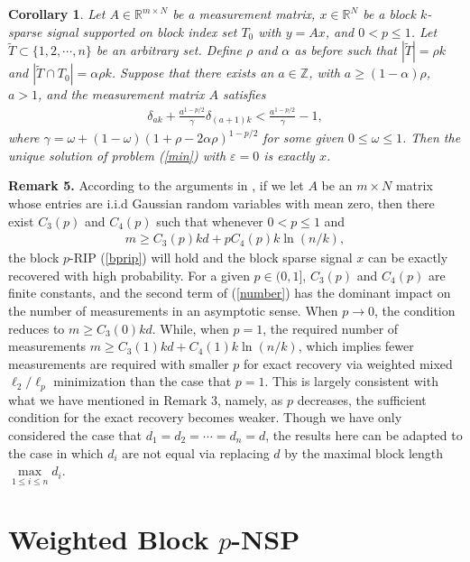 \documentclass[11pt]{article}
\newtheorem{cor}{Corollary}
\begin{document}
\begin{cor} Let $A\in\mathbb{R}^{m\times N}$ be a measurement matrix, $x\in\mathbb{R}^N$ be a block $k$-sparse signal supported on block index set $T_0$ with $y=Ax$, and $0<p\leq 1$. Let $\tilde{T}\subset\{1,2,\cdots,n\}$ be an arbitrary set. Define $\rho$ and $\alpha$ as before such that $|\tilde{T}|=\rho k$ and $|\tilde{T}\cap T_0|=\alpha\rho k$. Suppose that there exists an $a\in\mathbb{Z}$, with $a\geq (1-\alpha)\rho$, $a>1$, and the measurement matrix $A$ satisfies \begin{align}
\delta_{ak}+\frac{a^{1-p/2}}{\gamma}\delta_{(a+1)k}<\frac{a^{1-p/2}}{\gamma}-1,
\end{align}
where $\gamma=\omega+(1-\omega)(1+\rho-2\alpha\rho)^{1-p/2}$ for some given $0\leq \omega\leq 1$. Then the unique solution of problem (\ref{min}) with $\varepsilon=0$ is exactly $x$.
\end{cor}

\noindent
{\bf Remark 5.} According to the arguments in \cite{hwwx,wwx2}, if we let $A$ be an $m\times N$ matrix whose entries are i.i.d Gaussian random variables with mean zero, then there exist $C_3(p)$ and $C_4(p)$ such that whenever $0<p\leq 1$ and \begin{align}
m\geq C_3(p)kd+pC_4(p)k\ln(n/k), \label{number}
\end{align} the block $p$-RIP (\ref{bprip}) will hold and the block sparse signal $x$ can be exactly recovered with high probability. For a given $p\in(0,1]$, $C_3(p)$ and $C_4(p)$ are finite constants, and the second term of (\ref{number}) has the dominant impact on the number of measurements in an asymptotic sense. When $p\rightarrow 0$, the condition reduces to $m\geq C_3(0)kd$. While, when $p=1$, the required number of measurements $m\geq C_3(1)kd+C_4(1)k\ln(n/k)$, which implies fewer measurements are required with smaller $p$ for exact recovery via weighted mixed $\ell_2/\ell_p$ minimization than the case that $p=1$. This is largely consistent with what we have mentioned in Remark 3, namely, as $p$ decreases, the sufficient condition for the exact recovery becomes weaker. Though we have only considered the case that $d_1=d_2=\cdots=d_n=d$, the results here can be adapted to the case in which $d_i$ are not equal via replacing $d$ by the maximal block length $\max\limits_{1\leq i\leq n}d_i$.

\section{Weighted Block $p$-NSP}
\end{document}
